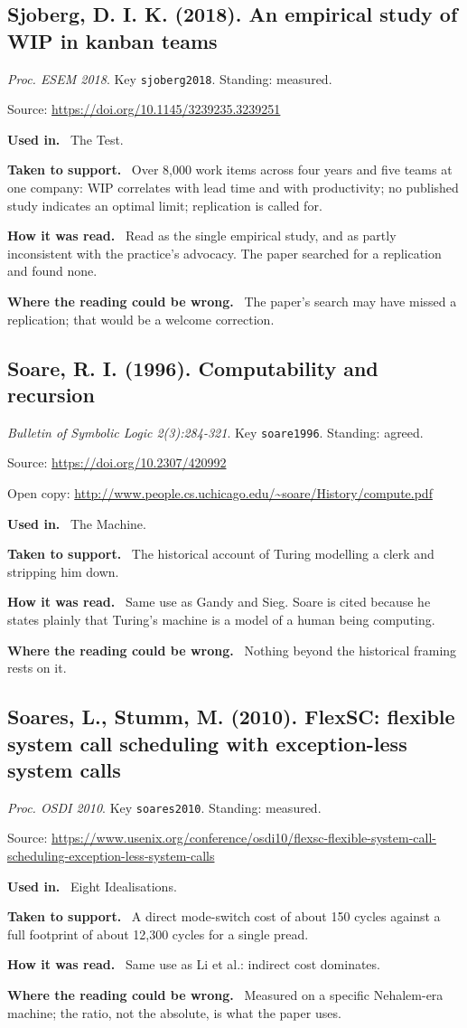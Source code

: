 \documentclass[11pt,oneside]{article}
\newcommand{\field}[1]{\par\noindent\textbf{\color{accent}#1.}\ }
\begin{document}
\hypertarget{src:sjoberg2018}{}
\subsection*{Sjoberg, D. I. K. (2018). An empirical study of WIP in kanban teams}
\noindent\small\emph{Proc. ESEM 2018}. Key \texttt{sjoberg2018}. Standing: measured.
\par\noindent\small Source: \url{https://doi.org/10.1145/3239235.3239251}
\normalsize
\field{Used in} The Test.
\field{Taken to support} Over 8,000 work items across four years and five teams at one company: WIP correlates with lead time and with productivity; no published study indicates an optimal limit; replication is called for.
\field{How it was read} Read as the single empirical study, and as partly inconsistent with the practice's advocacy. The paper searched for a replication and found none.
\field{Where the reading could be wrong} The paper's search may have missed a replication; that would be a welcome correction.

\hypertarget{src:soare1996}{}
\subsection*{Soare, R. I. (1996). Computability and recursion}
\noindent\small\emph{Bulletin of Symbolic Logic 2(3):284-321}. Key \texttt{soare1996}. Standing: agreed.
\par\noindent\small Source: \url{https://doi.org/10.2307/420992}
\par\noindent\small Open copy: \url{http://www.people.cs.uchicago.edu/~soare/History/compute.pdf}
\normalsize
\field{Used in} The Machine.
\field{Taken to support} The historical account of Turing modelling a clerk and stripping him down.
\field{How it was read} Same use as Gandy and Sieg. Soare is cited because he states plainly that Turing's machine is a model of a human being computing.
\field{Where the reading could be wrong} Nothing beyond the historical framing rests on it.

\hypertarget{src:soares2010}{}
\subsection*{Soares, L., Stumm, M. (2010). FlexSC: flexible system call scheduling with exception-less system calls}
\noindent\small\emph{Proc. OSDI 2010}. Key \texttt{soares2010}. Standing: measured.
\par\noindent\small Source: \url{https://www.usenix.org/conference/osdi10/flexsc-flexible-system-call-scheduling-exception-less-system-calls}
\normalsize
\field{Used in} Eight Idealisations.
\field{Taken to support} A direct mode-switch cost of about 150 cycles against a full footprint of about 12,300 cycles for a single pread.
\field{How it was read} Same use as Li et al.: indirect cost dominates.
\field{Where the reading could be wrong} Measured on a specific Nehalem-era machine; the ratio, not the absolute, is what the paper uses.
\end{document}
